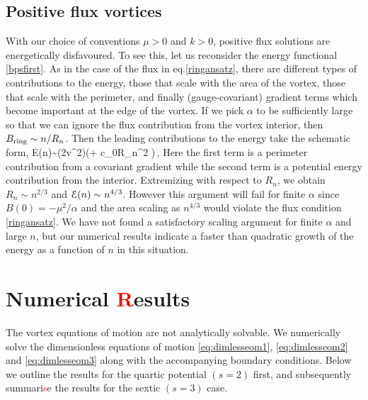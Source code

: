 \subsection{Positive flux vortices}
With our choice of conventions  $\mu >0$ and $k>0$, positive flux solutions are energetically disfavoured. To see this, let us  reconsider the energy functional \eqref{bpsfirst}.  As in the case of the flux in eq.\eqref{ringansatz}, there are different types of contributions to the energy, those that scale with the area of the vortex, those that scale with the perimeter, and finally (gauge-covariant) gradient  terms which become important at the edge of the vortex.
If we pick $\alpha$ to be sufficiently large so that we can ignore the flux contribution from the vortex interior, then 
$B_{\rm ring}\sim n/R_n$. Then the leading contributions to the energy take the schematic form,
\be
{\cal E}(n)\sim (2\pi v^2)\left(\Delta + c_0\pi R_n^2 \right)\,,\qquad \alpha{}
\ee
Here the first term is a perimeter contribution from a covariant gradient while the second term is a potential energy contribution from the interior. Extremizing with respect to $R_n$, we obtain $R_n\sim n^{2/3}$ and ${\cal E}(n)\sim n^{4/3}$.
However this argument will fail for  finite $\alpha$ since $B(0)=-\mu^2/\alpha$ and the area scaling as $n^{4/3}$ would violate  the flux condition \eqref{ringansatz}.  We have not found a satisfactory scaling argument for finite $\alpha$ and large $n$, but our numerical results indicate a faster than quadratic growth of the energy as a function of $n$ in this situation.


%

\section{Numerical \textcolor{red}{R}esults} \label{sec:Numerical_Results_vortex}
The vortex equations of motion are not analytically solvable. We numerically solve the dimensionless equations of motion \eqref{eq:dimlesseom1}, \eqref{eq:dimlesseom2} and \eqref{eq:dimlesseom3} along with the accompanying boundary conditions. Below we outline the results for the quartic potential $(s=2)$ first, and subsequently  summari\textcolor{red}{s}e the results for the sextic $(s=3)$ case.
